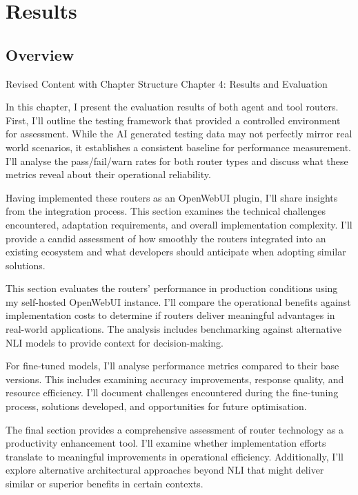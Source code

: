 \chapter{Results}
\label{chap:results}

\section{Overview}
\label{sec:results-overview}


Revised Content with Chapter Structure
Chapter 4: Results and Evaluation

In this chapter, I present the evaluation results of both agent and tool routers. First, I'll outline the testing framework that provided a controlled environment for assessment. While the AI generated testing data may not perfectly mirror real world scenarios, it establishes a consistent baseline for performance measurement. I'll analyse the pass/fail/warn rates for both router types and discuss what these metrics reveal about their operational reliability.

Having implemented these routers as an OpenWebUI plugin, I'll share insights from the integration process. This section examines the technical challenges encountered, adaptation requirements, and overall implementation complexity. I'll provide a candid assessment of how smoothly the routers integrated into an existing ecosystem and what developers should anticipate when adopting similar solutions.

This section evaluates the routers' performance in production conditions using my self-hosted OpenWebUI instance. I'll compare the operational benefits against implementation costs to determine if routers deliver meaningful advantages in real-world applications. The analysis includes benchmarking against alternative NLI models to provide context for decision-making.

For fine-tuned models, I'll analyse performance metrics compared to their base versions. This includes examining accuracy improvements, response quality, and resource efficiency. I'll document challenges encountered during the fine-tuning process, solutions developed, and opportunities for future optimisation.

The final section provides a comprehensive assessment of router technology as a productivity enhancement tool. I'll examine whether implementation efforts translate to meaningful improvements in operational efficiency. Additionally, I'll explore alternative architectural approaches beyond NLI that might deliver similar or superior benefits in certain contexts.


